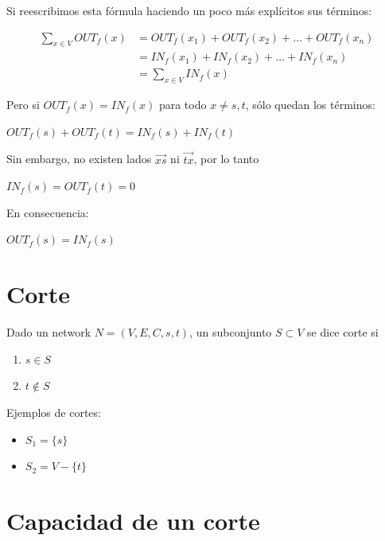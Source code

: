 \documentclass[10pt,a4paper]{article}
\begin{document}
Si reescribimos esta fórmula haciendo un poco más explícitos sus términos:

\begin{center}
\begin{align*} \sum\limits_{x \in V} OUT_f(x) &= OUT_f (x_1) + OUT_f(x_2) + \dots + OUT_f(x_n) \\ &= IN_f (x_1) + IN_f(x_2) + \dots + IN_f(x_n)\\ &= \sum\limits_{x \in V}IN_f(x) \end{align*}
\end{center}

Pero si $OUT_f(x) = IN_f(x)$ para todo $x \neq s, t$, sólo quedan los términos:

\begin{center}
$OUT_f(s) + OUT_f(t) = IN_f(s) + IN_f(t)$
\end{center}

Sin embargo, no existen lados $\overrightarrow{xs}$ ni $\overrightarrow{tx}$, por lo tanto

\begin{center}
$IN_f(s) = OUT_f(t) = 0 $
\end{center}

En consecuencia:

\begin{center}
$OUT_f(s) = IN_f(s)$
\end{center}

\section*{Corte}

Dado un network $N=(V, E, C, s, t)$, un subconjunto $S \subset V$ se dice corte si

\begin{enumerate}

	\item $s\in S$
	\item $t\not \in S$
\end{enumerate}

Ejemplos de cortes:

\begin{itemize}

	\item $S_1 = \{s\}$
	\item $S_2 = V - \{t\}$
\end{itemize}

\section*{Capacidad de un corte}
\end{document}
